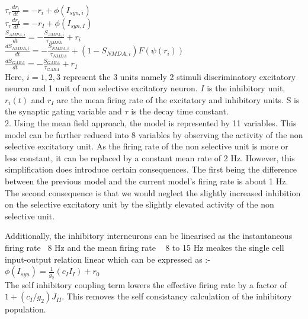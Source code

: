 \indent $\tau_{r} \frac{dr_{i}}{dt} = -r_{i} + \phi(I_{syn,i})$\\

\indent $\tau_{r} \frac{dr_{I}}{dt} = -r_{I} + \phi(I_{syn,I})$\\

\indent $\frac{S_{AMPA,i}}{dt} = - \frac{S_{AMPA,i}}{\tau_{AMPA}} + r_{i}$ \\

\indent $\frac{dS_{NMDA,i}}{dt} = - \frac{S_{NMDA,i}}{\tau_{NMDA}} + (1 - S_{NMDA,i})F(\psi(r_{i}))$ \\

\indent $\frac{dS_{GABA}}{dt} = - \frac{S_{GABA}}{\tau_{GABA}} + r_{I}$ \\

Here, $i = 1,2,3$ represent the 3 units namely 2 stimuli discriminatory excitatory neuron and 1 unit of non selective excitatory neuron. $I$ is the inhibitory unit, $r_{i}(t)$ and $r_{I}$ are the mean firing rate of the excitatory and inhibitory units. S is the synaptic gating variable and $\tau$ is the decay time constant. \\ 

2. Using the mean field approach, the model is represented by 11 variables. This model can be further reduced into 8 variables by observing the activity of the non selective excitatory unit. As the firing rate of the non selective unit is more or less constant, it can be replaced by a constant mean rate of 2 Hz. However, this simplification does introduce certain consequences. The first being the difference between the previous model and the current model's firing rate is about 1 Hz. The second consequence is that we would neglect the slightly increased inhibition on the selective excitatory unit by the slightly elevated activity of the non selective unit.

Additionally, the inhibitory interneurons can be linearised as the instantaneous firing rate ~8 Hz and the mean firing rate ~ 8 to 15 Hz meakes the single cell input-output relation linear which can be expressed as :-\\

\indent $\phi (I_{syn}) = \frac{1}{g_{2}}(c_{I} I_{I}) + r_{0}$ \\

The self inhibitory coupling term lowers the effective firing rate by a factor of $1 + (c_{I}/ g_{2})J_{II}$. This removes the self consistancy calculation of the inhibitory population. \\

